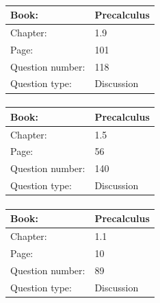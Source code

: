 \documentclass{article}
\begin{document}
            \paragraph{}
            \begin{tabularx}{1\textwidth}{
                    p{}
                    p{}
                }
                \toprule
                Book: & Precalculus
                \\
                \midrule
                Chapter: & 1.9
                \\
                \midrule
                Page: & 101
                \\
                \midrule
                Question number: & 118
                \\
                \midrule
                Question type: & Discussion
                \\
                \bottomrule
            \end{tabularx}
            
            \paragraph{}
            \begin{tabularx}{1\textwidth}{
                    p{}
                    p{}
                }
                \toprule
                Book: & Precalculus
                \\
                \midrule
                Chapter: & 1.5
                \\
                \midrule
                Page: & 56
                \\
                \midrule
                Question number: & 140
                \\
                \midrule
                Question type: & Discussion
                \\
                \bottomrule
            \end{tabularx}
            
            \paragraph{}
            \begin{tabularx}{1\textwidth}{
                    p{}
                    p{}
                }
                \toprule
                Book: & Precalculus
                \\
                \midrule
                Chapter: & 1.1
                \\
                \midrule
                Page: & 10
                \\
                \midrule
                Question number: & 89
                \\
                \midrule
                Question type: & Discussion
                \\
                \bottomrule
            \end{tabularx}
            
\end{document}
